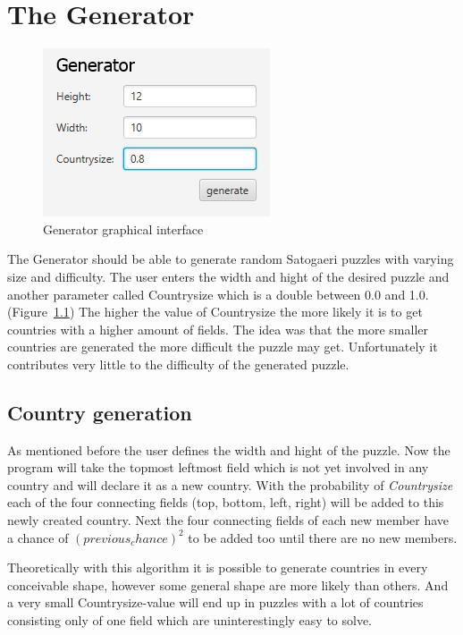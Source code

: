 \chapter{The Generator} \label{The Generator}
\begin{figure}
  \centering
  \includegraphics[scale=1]{Pictures/generator.png} 
  \caption{Generator graphical interface}
  \label{fig:generator}
\end{figure}
The Generator should be able to generate random Satogaeri puzzles with varying size and difficulty. The user enters the width and hight of the desired puzzle and another parameter called Countrysize which is a double between 0.0 and 1.0. (Figure~\ref{fig:generator}) The higher the value of Countrysize the more likely it is to get countries with a higher amount of fields. The idea was that the more smaller countries are generated the more difficult the puzzle may get. Unfortunately it contributes very little to the difficulty of the generated puzzle.

\section{Country generation}
As mentioned before the user defines the width and hight of the puzzle. Now the program will take the topmost leftmost field which is not yet involved in any country and will declare it as a new country. With the probability of \emph{Countrysize} each of the four connecting fields (top, bottom, left, right) will be added to this newly created country. Next the four connecting fields of each new member have a chance of \emph{\((previous_chance)^2\)} to be added too until there are no new members.

Theoretically with this algorithm it is possible to generate countries in every conceivable shape, however some general shape are more likely than others. And a very small Countrysize-value will end up in puzzles with a lot of countries consisting only of one field which are uninterestingly easy to solve.

